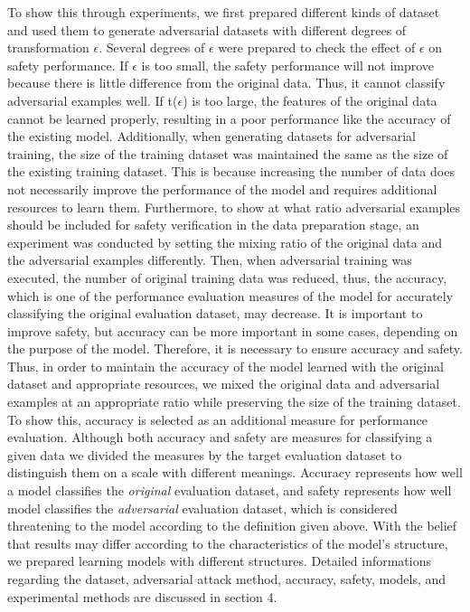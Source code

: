 \documentclass[journal,article,submit,moreauthors,pdftex]{Definitions/mdpi}
\begin{document}
To show this through experiments, we first prepared different kinds of dataset and used them to generate adversarial datasets with different degrees of transformation \begin{math}\epsilon\end{math}.
Several degrees of \begin{math}\epsilon\end{math} were prepared to check the effect of \begin{math}\epsilon\end{math} on safety performance. If \begin{math}\epsilon\end{math} is too small, the safety performance will not improve because there is little difference from the original data. Thus, it cannot classify adversarial examples well. If t(\begin{math}\epsilon\end{math}) is too large, the features of the original data cannot be learned properly, resulting in a poor performance like the accuracy of the existing model.
Additionally, when generating datasets for adversarial training, the size of the training dataset was maintained the same as the size of the existing training dataset.
This is because increasing the number of data does not necessarily improve the performance of the model and requires additional resources to learn them.
Furthermore, to show at what ratio adversarial examples should be included for safety verification in the data preparation stage, an experiment was conducted by setting the mixing ratio of the original data and the adversarial examples differently.
Then, when adversarial training was executed, the number of original training data was reduced, thus, the accuracy, which is one of the performance evaluation measures of the model for accurately classifying the original evaluation dataset, may decrease\cite{trade-off}. 
It is important to improve safety, but accuracy can be more important in some cases, depending on the purpose of the model.
Therefore, it is necessary to ensure accuracy and safety. 
Thus, in order to maintain the accuracy of the model learned with the original dataset and appropriate resources, we mixed the original data and adversarial examples at an appropriate ratio while preserving the size of the training dataset.
To show this, accuracy is selected as an additional measure for performance evaluation.
Although both accuracy and safety are measures for classifying a given data we divided the measures by the target evaluation dataset to distinguish them on a scale with different meanings.
Accuracy represents how well a model classifies the {\it original} evaluation dataset, and safety represents how well model classifies the {\it adversarial} evaluation dataset, which is considered threatening to the model according to the definition given above.
With the belief that results may differ according to the characteristics of the model's structure, we prepared learning models with different structures. 
Detailed informations regarding the dataset, adversarial attack method, accuracy, safety, models, and experimental methods are discussed in section 4.
\end{document}
